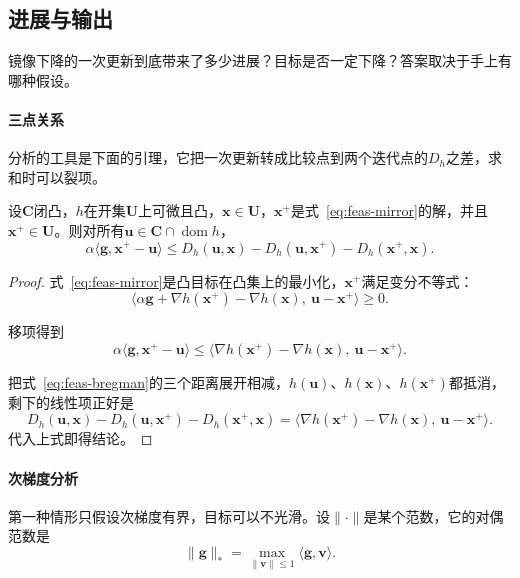 \subsection{进展与输出}
\label{sec:feas-mirror-progress}

镜像下降的一次更新到底带来了多少进展？目标是否一定下降？答案取决于手上有哪种假设。

\paragraph{三点关系}
分析的工具是下面的引理，它把一次更新转成比较点到两个迭代点的$D_h$之差，求和时可以裂项。

\begin{lemma}[三点关系]
\label{lem:feas-three-point}
设$\bm{C}$闭凸，$h$在开集$\bm{U}$上可微且凸，$\bm{x}\in\bm{U}$，$\bm{x}^{+}$是式~\eqref{eq:feas-mirror}的解，并且$\bm{x}^{+}\in\bm{U}$。则对所有$\bm{u}\in\bm{C}\cap\operatorname{dom}h$，
\begin{equation}
 \alpha\langle\bm{g},\bm{x}^{+}-\bm{u}\rangle\leq D_h(\bm{u},\bm{x})-D_h(\bm{u},\bm{x}^{+})-D_h(\bm{x}^{+},\bm{x}).
 \label{eq:feas-three-point}
\end{equation}
\end{lemma}

\begin{proof}
式~\eqref{eq:feas-mirror}是凸目标在凸集上的最小化，$\bm{x}^{+}$满足变分不等式：
\[
 \bigl\langle\alpha\bm{g}+\nabla h(\bm{x}^{+})-\nabla h(\bm{x}),\ \bm{u}-\bm{x}^{+}\bigr\rangle\geq0.
\]

移项得到
\[
 \alpha\langle\bm{g},\bm{x}^{+}-\bm{u}\rangle\leq\bigl\langle\nabla h(\bm{x}^{+})-\nabla h(\bm{x}),\ \bm{u}-\bm{x}^{+}\bigr\rangle.
\]

把式~\eqref{eq:feas-bregman}的三个距离展开相减，$h(\bm{u})$、$h(\bm{x})$、$h(\bm{x}^{+})$都抵消，剩下的线性项正好是
\[
 D_h(\bm{u},\bm{x})-D_h(\bm{u},\bm{x}^{+})-D_h(\bm{x}^{+},\bm{x})
 =\bigl\langle\nabla h(\bm{x}^{+})-\nabla h(\bm{x}),\ \bm{u}-\bm{x}^{+}\bigr\rangle.
\]
代入上式即得结论。
\end{proof}

\paragraph{次梯度分析}
第一种情形只假设次梯度有界，目标可以不光滑。设$\lVert\cdot\rVert$是某个范数，它的对偶范数是
\[
 \lVert\bm{g}\rVert_{*}=\max_{\lVert\bm{v}\rVert\leq1}\langle\bm{g},\bm{v}\rangle.
\]

